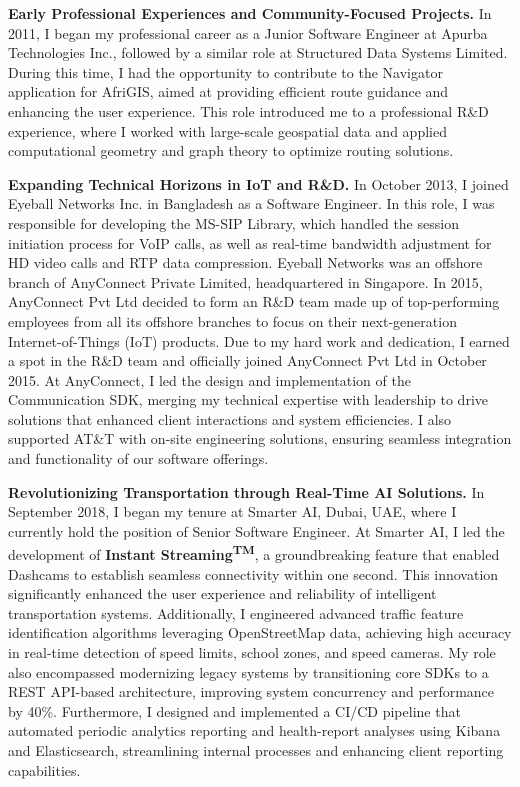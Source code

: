 \textbf{Early Professional Experiences and Community-Focused Projects.}
In 2011, I began my professional career as a Junior Software Engineer at Apurba Technologies Inc.,
followed by a similar role at Structured Data Systems Limited.
During this time, I had the opportunity to contribute to the Navigator application for AfriGIS,
aimed at providing efficient route guidance and enhancing the user experience.
This role introduced me to a professional R\&D experience, where I worked with large-scale geospatial data
and applied computational geometry and graph theory to optimize routing solutions.

\textbf{Expanding Technical Horizons in IoT and R\&D.}
In October 2013, I joined Eyeball Networks Inc. in Bangladesh as a Software Engineer.
In this role, I was responsible for developing the MS-SIP Library, which handled the session initiation process for VoIP calls,
as well as real-time bandwidth adjustment for HD video calls and RTP data compression.
Eyeball Networks was an offshore branch of AnyConnect Private Limited, headquartered in Singapore.
In 2015, AnyConnect Pvt Ltd decided to form an R\&D team made up of top-performing employees
from all its offshore branches to focus on their next-generation Internet-of-Things (IoT) products.
Due to my hard work and dedication, I earned a spot in the R\&D team and officially joined AnyConnect Pvt Ltd in October 2015.
At AnyConnect, I led the design and implementation of the Communication SDK, merging my technical expertise
with leadership to drive solutions that enhanced client interactions and system efficiencies.
I also supported AT\&T with on-site engineering solutions, ensuring seamless integration and functionality of our software offerings.

\newpage

\textbf{Revolutionizing Transportation through Real-Time AI Solutions.}
In September 2018, I began my tenure at Smarter AI, Dubai, UAE, where I currently hold the position of Senior Software Engineer.
At Smarter AI, I led the development of \textbf{Instant Streaming\textsuperscript{TM}}, a groundbreaking feature
that enabled Dashcams to establish seamless connectivity within one second.
This innovation significantly enhanced the user experience and reliability of intelligent transportation systems.
Additionally, I engineered advanced traffic feature identification algorithms leveraging OpenStreetMap data,
achieving high accuracy in real-time detection of speed limits, school zones, and speed cameras.
My role also encompassed modernizing legacy systems by transitioning core SDKs to a REST API-based architecture,
improving system concurrency and performance by 40\%.
Furthermore, I designed and implemented a CI/CD pipeline that automated periodic analytics reporting and health-report
analyses using Kibana and Elasticsearch, streamlining internal processes and enhancing client reporting capabilities.

